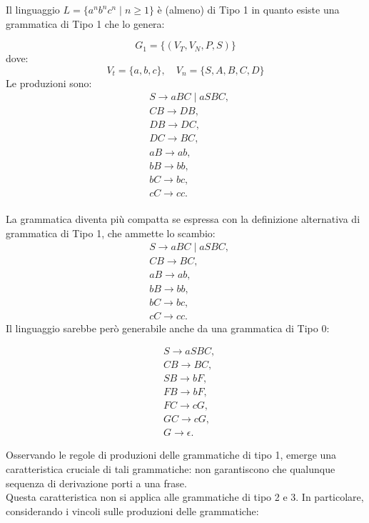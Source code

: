 \documentclass{article}
\begin{document}
\begin{example}
Il linguaggio \( L = \{ a^n b^n c^n \mid n \geq 1 \} \) è (almeno) di Tipo 1 in quanto esiste una grammatica di Tipo 1 che lo genera:

\[
G_1 = \{( V_T, V_N, P, S )\}
\]
dove:
\[
V_t = \{a, b, c\}, \quad V_n = \{S, A, B, C, D\}
\]
Le produzioni sono:
\[
\begin{aligned}
    &S \rightarrow aBC \mid aSBC, \\
    &CB \rightarrow DB, \\
    &DB \rightarrow DC, \\
    &DC \rightarrow BC, \\
    &aB \rightarrow ab, \\
    &bB \rightarrow bb, \\
    &bC \rightarrow bc, \\
    &cC \rightarrow cc.
\end{aligned}
\]
\\
La grammatica diventa più compatta se espressa con la definizione alternativa di grammatica di Tipo 1, che ammette lo scambio:
\[
\begin{aligned}
    &S \rightarrow aBC \mid aSBC, \\
    &CB \rightarrow BC, \\
    &aB \rightarrow ab, \\
    &bB \rightarrow bb, \\
    &bC \rightarrow bc, \\
    &cC \rightarrow cc.
\end{aligned}
\]
\noindent
Il linguaggio sarebbe però generabile anche da una grammatica di Tipo 0:

\[
\begin{aligned}
    &S \rightarrow aSBC, \\
    &CB \rightarrow BC, \\
    &SB \rightarrow bF, \\
    &FB \rightarrow bF, \\
    &FC \rightarrow cG, \\
    &GC \rightarrow cG, \\
    &G \rightarrow \epsilon.
\end{aligned}
\] 
\end{example}
\noindent Osservando le regole di produzioni delle grammatiche di tipo 1, emerge una caratteristica cruciale di tali grammatiche: non garantiscono che qualunque sequenza di derivazione porti a una frase.\\Questa caratteristica non si applica alle grammatiche di tipo 2 e 3. In particolare, considerando i vincoli sulle produzioni delle grammatiche:
\end{document}
